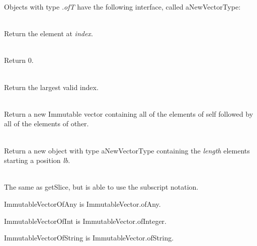 \noindent Objects with type {\it {}.of\/\LB{}T\/\RB{}} have the
following interface, called aNewVectorType:

\begin{desc}
  \item[\kw{function}  getElement\/\LB{}index \CO{} \tn{Integer}\/\RB{} \returns{} \/\LB{}T\/\RB{}]~\\
    Return the element at {\it index}.
  \item[\kw{function}  lowerbound \returns{} \/\LB{}\tn{Integer}\/\RB{}]~\\
    Return 0.
  \item[\kw{function}  upperbound \returns{} \/\LB{}\tn{Integer}\/\RB{}]~\\
    Return the largest valid index.
  \item[\kw{operation} catenate \/\LB{}other \CO{} aNewVectorType\/\RB{} \returns{} \LB{}aNewVectorType\/\RB{}]~\\
    Return a new Immutable vector containing all of the elements of self
    followed by all of the elements of other.
  \item[\kw{function}  getSlice\/\LB{}lb \CO{} \tn{Integer}, length\CO{} \tn{Integer}\/\RB{} \returns{} \/\LB{}aNewVectorType\/\RB{}]~\\
    Return a new object with type aNewVectorType containing the {\it length}
    elements starting a position {\it lb}.
  \item[\kw{function}  getElement\/\LB{}lb \CO{} \tn{Integer}, length\CO{} \tn{Integer}\/\RB{} \returns{} \/\LB{}aNewVectorType\/\RB{}]~\\
    The same as getSlice, but is able to use the subscript notation.
\end{desc}

\label{builtin ImmutableVectorOfAny}
ImmutableVectorOfAny is ImmutableVector.of{Any}.

\label{builtin ImmutableVectorOfInt}
ImmutableVectorOfInt is ImmutableVector.of{Integer}.

\label{builtin ImmutableVectorOfString}
ImmutableVectorOfString is ImmutableVector.of{String}.

